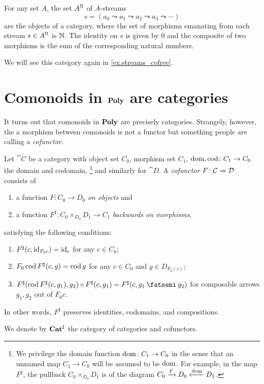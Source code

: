 \documentclass[Book-Poly]{subfiles}
\begin{document}
\begin{example}\label{ex.streams_category}
For any set $A$, the set $A^{\mathbb{N}}$ of $A$-streams
\[
s=(a_0\leadsto a_1\leadsto a_2\leadsto a_3\leadsto\cdots)
\]
are the objects of a category, where the set of morphisms emanating from each stream $s\in A^{\mathbb{N}}$ is $\mathbb{N}$. The identity on $s$ is given by $0$ and the composite of two morphisms is the sum of the corresponding natural numbers.

We will see this category again in \cref{ex.streams_cofree}.
\end{example}

\section{Comonoids in $\mathbf{Poly}$ are categories}

It turns out that comonoids in $\mathbf{Poly}$ are precisely categories. Strangely, however, the a morphism between comonoids is not a functor but something people are calling a \emph{cofunctor}.

\begin{definition}[Cofunctor]\label{def.cofunctor}
Let $\cat{C}$ be a category with object set $C_0$, morphism set $C_1$, $\operatorname{dom},\operatorname{cod}\colon C_1\to C_0$ the domain and codomain,%
\footnote{We privilege the domain function $\operatorname{dom}\colon C_1\to C_0$ in the sense that an unnamed map $C_1\to C_0$ will be assumed to be $\operatorname{dom}$. For example, in the map $F^\sharp$, the pullback $C_0\times_{D_0}D_1$ is of the diagram $C_0\xrightarrow{F}D_0\xleftarrow{\operatorname{dom}}D_1$.}
 and similarly for $\cat{D}$. A \emph{cofunctor} $F\colon \mathcal{C}\nrightarrow \mathcal{D}$ consists of
\begin{enumerate}[itemsep=0pt]
  \item a function  $F\colon C_0\to D_0$ \emph{on objects} and
  \item a function $F^\sharp\colon C_0\times_{D_0}D_1\to C_1$ \emph{backwards on morphisms},
\end{enumerate}
satisfying the following conditions:
\begin{enumerate}[itemsep=0pt, label=\roman*.]
	\item $F^\sharp(c,\mathrm{id}_{F_0c})=\mathrm{id}_c$ for any $c\in C_0$;
	\item $F_0\operatorname{cod} F^\sharp(c,g)=\operatorname{cod} g$ for any $c\in C_0$ and $g\in D_{F_0(c)}$;
	\item $F^\sharp(\cod F^\sharp(c,g_1),g_2)\circ F^\sharp(c,g_1)=F^\sharp(c,g_1\then g_2)$ for composable arrows $g_1,g_2$ out of $F_0 c$.
\end{enumerate}
In other words, $F^\sharp$ preserves identities, codomains, and compositions.

We denote by $\mathbf{Cat}^\sharp$ the category of categories and cofunctors.
\end{definition}
\end{document}
